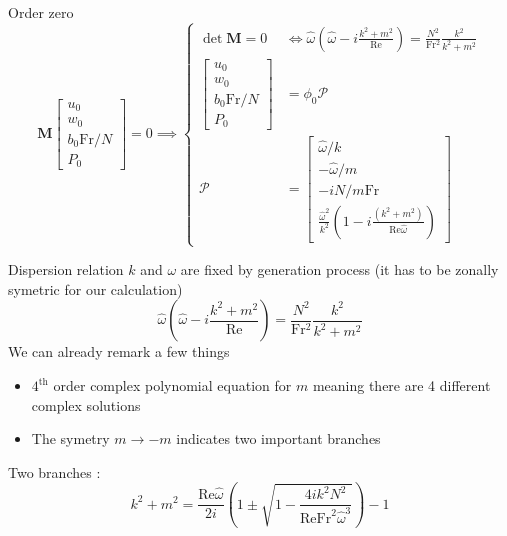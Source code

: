 \documentclass[10pt]{beamer}
\begin{document}
\begin{frame}[fragile]{Order zero}
  	\begin{equation*}\!\!\!\!\!\!\!\!\!\!\!\!\!
  		\mathbf{M}
  		\begin{bmatrix}
  			u_{0}\\
  			w_{0}\\
  			b_{0}\mathrm{Fr}/N\\
  			P_{0}
  		\end{bmatrix}
  		=0 \implies 
  		\begin{cases}
  			\det{\mathbf{M}}=0&\iff \hat{\omega}\left(\hat{\omega}-i\frac{k^{2}+m^{2}}{\mathrm{Re}}\right)=\frac{N^{2}}{\mathrm{Fr^{2}}}\frac{k^2}{k^2+m^2}\\
  			\begin{bmatrix}
  				u_{0}\\
  				w_{0}\\
  				b_{0}\mathrm{Fr}/N\\
  				P_{0}
  			\end{bmatrix}&
  			=\phi_{0}\boldsymbol{\mathcal{P}}\\
  			\boldsymbol{\mathcal{P}}&=
  			\begin{bmatrix}
  				\hat{\omega}/k\\
  				-\hat{\omega}/m\\
  				-iN/m\mathrm{Fr}\\
  				\frac{\hat{\omega}^{2}}{k^{2}}\left(1-i\frac{\left(k^{2}+m^{2}\right)}{\mathrm{Re}\hat{\omega}} \right)
  			\end{bmatrix}
  		\end{cases}
  	\end{equation*}
\end{frame}

\begin{frame}[fragile]{Dispersion relation}
	$k$ and $\omega$ are fixed by generation process (it has to be zonally symetric for our calculation)
 	\begin{equation*}
    	 \hat{\omega}\left(\hat{\omega}-i\frac{k^{2}+m^{2}}{\mathrm{Re}}\right)=\frac{N^{2}}{\mathrm{Fr^{2}}}\frac{k^2}{k^2+m^2}
  	\end{equation*}
  	We can already remark a few things
  	\begin{itemize}
    	\item $4^{\mathrm{th}}$ order complex polynomial equation for $m$ meaning there are 4 different complex solutions
    	\item The symetry $m\to-m$ indicates two important branches
  	\end{itemize}
  	Two branches :
  	\begin{equation*}
  	  	k^{2}+m^{2}=\frac{\mathrm{Re}\hat{\omega}}{2i}\left(1\pm\sqrt{1-\frac{4ik^{2}N^{2}}{\mathrm{Re}\mathrm{Fr}^{2}\hat{\omega}^{3}}}\right)-1
  	\end{equation*}
\end{frame}
\end{document}
